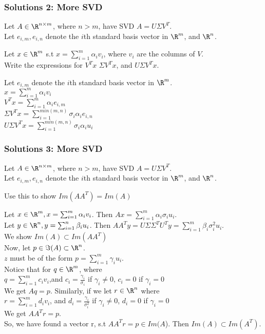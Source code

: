 \documentclass{beamer}
\renewenvironment{enumerate}%
{\begin{list}{\arabic{enumi}.}%
      {\setlength{\leftmargin}{2.5em}%
       \setlength{\itemsep}{-\parsep}%
       \setlength{\topsep}{-\parskip}%
       \usecounter{enumi}}%
 }{\end{list}}
\begin{document}
\begin{frame}
\frametitle{Solutions 2: More SVD}
Let $A\in \R^{n\times m}$, where $n>m$, have SVD $A=U\Sigma V^T$.\\ 
Let $e_{i,m}, e_{i,n}$ denote the $i$th standard basis vector in $\R^m$, and $\R^n$.
\begin{enumerate}
\item[2.] Let $x\in \R^m$ s.t $x = \sum_{i=1}^m\alpha_i v_i$, where $v_i$ are the columns of $V$.\\ Write the expressions for $V^Tx$ $\Sigma V^Tx$, and $U\Sigma V^Tx$.
\begin{solution}
Let $e_{i,m}$ denote the $i$th standard basis vector in $\R^m$. \\
$x = \sum_{i=1}^m\alpha_i v_i$\\
$V^Tx = \sum_{i=1}^m\alpha_i e_{i,m}$ \\
$\Sigma V^Tx = \sum_{i=1}^{min(m,n)} \sigma_i \alpha_i e_{i,n}$ \\
$U \Sigma V^Tx = \sum_{i=1}^{min(m,n)} \sigma_i \alpha_i u_i$ \\
\end{solution}
\end{enumerate}
\end{frame}

\begin{frame}
\frametitle{Solutions 3: More SVD}
Let $A\in \R^{n\times m}$, where $n>m$, have SVD $A=U\Sigma V^T$.\\ 
Let $e_{i,m}, e_{i,n}$ denote the $i$th standard basis vector in $\R^m$, and $\R^n$.
\begin{enumerate}
\item[3.] Use this to show $Im(AA^T) = Im(A)$
\begin{solution}
Let $x \in \R^m, x = \sum_{i=1}^m \alpha_i v_i$. Then $Ax =  \sum_{i=1}^m \alpha_i \sigma_i u_i$. \\
Let $y \in \R^n, y = \sum_{i=1}^n \beta_i u_i$. Then $AA^Ty = U\Sigma\Sigma^TU^Ty = \sum_{i=1}^m \beta_i \sigma_i^2 u_i$.\\

We show $Im(A) \subset Im(AA^T)$\\
Now, let $p \in \Im(A) \subset\R^n$.\\
$z$ must be of the form $p = \sum_{i=1}^m \gamma_i u_i$. \\
Notice that for $q\in \R^m$, where\\
\quad  $q = \sum_{i=1}^m c_i v_i$,\quad and \quad $c_i = \frac{\gamma_i}{\sigma_i}$ if $\gamma_i\neq 0$, $c_i = 0$ if $\gamma_i=0$\\
We get $Aq = p$.
Similarly, if we let $r\in \R^n$ where\\
\quad $r =  \sum_{i=1}^m d_i v_i$, \quad and \quad $d_i = \frac{\gamma_i}{\sigma_i^2}$ if $\gamma_i\neq 0$, $d_i = 0$ if $\gamma_i=0$\\
We get $AA^Tr = p$.\\
So, we have found a vector r, s.t $AA^Tr = p\in Im(A$). Then $Im(A)\subset Im(A^T).$
\end{solution}
\end{enumerate}
\end{frame}
\end{document}
